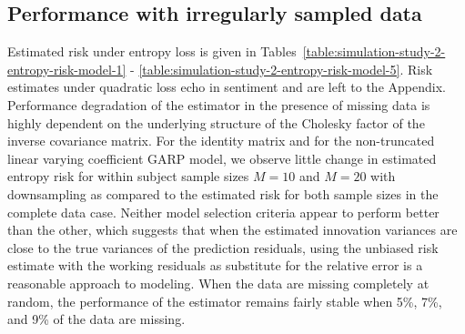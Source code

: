 %
\subsection{Performance with irregularly sampled data}
%

Estimated risk under entropy loss is given in Tables~\ref{table:simulation-study-2-entropy-risk-model-1} - \ref{table:simulation-study-2-entropy-risk-model-5}.  Risk estimates under quadratic loss echo in sentiment and are left to the Appendix.  Performance degradation of the estimator in the presence of missing data is highly dependent on the underlying structure of the Cholesky factor of the inverse covariance matrix. For the identity matrix and for the non-truncated linear varying coefficient GARP model, we observe little change in estimated entropy risk for within subject sample sizes $M = 10$ and $M = 20$ with downsampling as compared to the estimated risk for both sample sizes in the complete data case.  Neither model selection criteria appear to perform better than the other, which suggests that when the estimated innovation variances are close to the true variances of the prediction residuals, using the unbiased risk estimate with the working residuals as substitute for the relative error is a reasonable approach to modeling. When the data are missing completely at random, the performance of the estimator remains fairly stable when 5\%, 7\%, and 9\% of the data are missing. 

